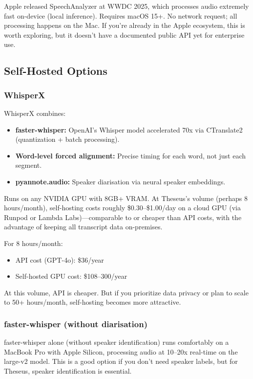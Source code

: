 \documentclass[11pt,letterpaper]{article}
\begin{document}
Apple released SpeechAnalyzer at WWDC 2025, which processes audio extremely fast on-device (local inference). Requires macOS 15+. No network request; all processing happens on the Mac. If you're already in the Apple ecosystem, this is worth exploring, but it doesn't have a documented public API yet for enterprise use.

\subsection{Self-Hosted Options}

\subsubsection{WhisperX}

WhisperX combines:
\begin{itemize}
  \item \textbf{faster-whisper:} OpenAI's Whisper model accelerated 70x via CTranslate2 (quantization + batch processing).
  \item \textbf{Word-level forced alignment:} Precise timing for each word, not just each segment.
  \item \textbf{pyannote.audio:} Speaker diarisation via neural speaker embeddings.
\end{itemize}

Runs on any NVIDIA GPU with 8GB+ VRAM. At Theseus's volume (perhaps 8 hours/month), self-hosting costs roughly \$0.30–\$1.00/day on a cloud GPU (via Runpod or Lambda Labs)—comparable to or cheaper than API costs, with the advantage of keeping all transcript data on-premises.

For 8 hours/month:
\begin{itemize}
  \item API cost (GPT-4o): \$36/year
  \item Self-hosted GPU cost: \$108–300/year
\end{itemize}

At this volume, API is cheaper. But if you prioritize data privacy or plan to scale to 50+ hours/month, self-hosting becomes more attractive.

\subsubsection{faster-whisper (without diarisation)}

faster-whisper alone (without speaker identification) runs comfortably on a MacBook Pro with Apple Silicon, processing audio at 10–20x real-time on the large-v2 model. This is a good option if you don't need speaker labels, but for Theseus, speaker identification is essential.
\end{document}
